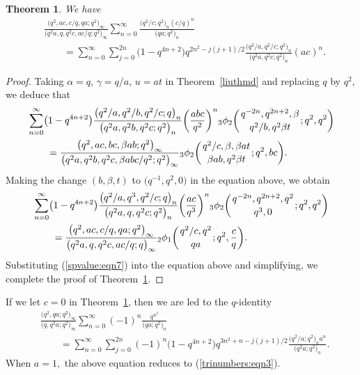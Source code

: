 \documentclass[10pt,a4paper]{amsart}
\numberwithin{equation}{section}
\newtheorem{Theorem}{Theorem}[section]
\begin{document}
\begin{Theorem}\label{Gaussthm} We have
\begin{align*} %
&\frac{\bigl(q^2, ac, c/q, qa; q^2\bigr)_\infty}{\bigl(q^2a, q, q^2c, ac/q; q^2\bigr)_\infty}
\sum_{n=0}^\infty \frac{\bigl(q^2/c; q^2\bigr)_n (c/q)^n}{\bigl(qa; q^2\bigr)_n}\\
&\qquad{}=\sum_{n=0}^\infty \sum_{j=0}^{2n} \bigl(1-q^{4n+2}\bigr) q^{2n^2-j(j+1)/2}
\frac{\bigl(q^2/a, q^2/c; q^2\bigr)_n}{\bigl(q^2a, q^2c; q^2\bigr)_n} (ac)^n.\nonumber
\end{align*}	
\end{Theorem}
\begin{proof}
Taking $\alpha=q$, $\gamma=q/a$, $u=at$ in Theorem~\ref{liuthmd} and replacing $q$ by $q^2$, we deduce that
 \begin{align*}%
 	&\sum_{n=0}^\infty\bigl(1-q^{4n+2}\bigr) \frac{\bigl(q^2/a, q^2/b, q^2/c; q\bigr)_n}{\bigl(q^2a, q^2b, q^2c; q^2\bigr)_n} \biggl(\frac{abc}{q^2}\biggr)^n {_3\phi_2}\biggl({{q^{-2n}, q^{2n+2}, \beta}\atop{q^2/b, q^2\beta t}}; q^2, q^2\biggr)\\
&\qquad{} 	=\frac{\bigl(q^2, ac, bc, \beta ab; q^2\bigr)_\infty}{\bigl(q^2a, q^2b, q^2c, \beta abc/q^2; q^2\bigr)_\infty}
 	{_3\phi_2}\biggl({{q^2/c, \beta, \beta at}\atop{\beta ab, q^2\beta t}}; q^2, bc\biggr).\nonumber
 \end{align*}	
 Making the change $(b, \beta, t)$ to $\bigl(q^{-1}, q^2, 0\bigr)$ in the equation above, we obtain
\begin{align*}%
	&\sum_{n=0}^\infty\bigl(1-q^{4n+2}\bigr) \frac{\bigl(q^2/a, q^3, q^2/c; q\bigr)_n}{\bigl(q^2a, q, q^2c; q^2\bigr)_n} \biggl(\frac{ac}{q^3}\biggr)^n {_3\phi_2}\biggl({{q^{-2n}, q^{2n+2}, q^2}\atop{q^3, 0}}; q^2, q^2\biggr)\\
&\qquad{}	=\frac{\bigl(q^2, ac, c/q, qa; q^2\bigr)_\infty}{\bigl(q^2a, q, q^2c, ac/q; q\bigr)_\infty}
	{_2\phi_1}\biggl({{q^2/c, q^2}\atop{qa}}; q^2, \frac{c}{q}\biggr). \nonumber
\end{align*}	
Substituting (\ref{spvalue:eqn7}) into the equation above and simplifying, we complete the proof of Theorem~\ref{Gaussthm}.
\end{proof}

If we let $c=0$ in Theorem~\ref{Gaussthm}, then we are led to the $q$-identity{\samepage
\begin{align}
&\frac{\bigl(q^2, qa; q^2\bigr)_\infty}{\bigl(q, q^2a; q^2\bigr)_\infty}
\sum_{n=0}^\infty (-1)^n\frac{q^{n^2}}{\bigl(qa; q^2\bigr)_n}\nonumber\\
&\qquad{}=\sum_{n=0}^\infty \sum_{j=0}^{2n} (-1)^n \bigl(1-q^{4n+2}\bigr) q^{3n^2+n-j(j+1)/2}
\frac{\bigl(q^2/a; q^2\bigr)_n a^n}{\bigl(q^2a; q^2\bigr)_n}.\label{Gauss:eqn3}
\end{align}
When $a=1,$ the above equation reduces to (\ref{trinumbers:eqn3}).}
\end{document}
